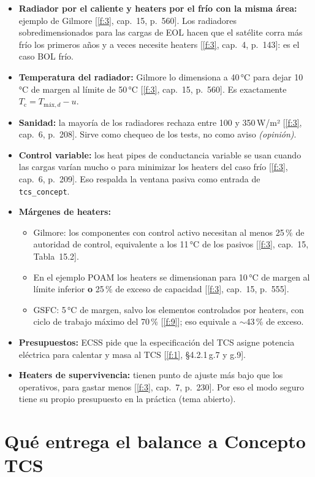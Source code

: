\documentclass[11pt,a4paper]{article}
\newcommand{\code}[1]{\texttt{#1}}
\newcommand{\op}[1]{\textcolor{opinion}{\textit{(#1)}}}
\newcommand{\f}[1]{\ref{f:#1}}
\begin{document}
\begin{itemize}
  \item \textbf{Radiador por el caliente y heaters por el frío con la misma área:} ejemplo de Gilmore [\f{3}, cap.~15, p.~560]. Los radiadores sobredimensionados para las cargas de EOL hacen que el satélite corra más frío los primeros años y a veces necesite heaters [\f{3}, cap.~4, p.~143]: es el caso BOL frío.
  \item \textbf{Temperatura del radiador:} Gilmore lo dimensiona a 40\,°C para dejar 10\,°C de margen al límite de 50\,°C [\f{3}, cap.~15, p.~560]. Es exactamente $T_\mathrm{c} = T_{\text{máx},d} - u$.
  \item \textbf{Sanidad:} la mayoría de los radiadores rechaza entre 100 y 350\,W/m² [\f{3}, cap.~6, p.~208]. Sirve como chequeo de los tests, no como aviso \op{opinión}.
  \item \textbf{Control variable:} los heat pipes de conductancia variable se usan cuando las cargas varían mucho o para minimizar los heaters del caso frío [\f{3}, cap.~6, p.~209]. Eso respalda la ventana pasiva como entrada de \code{tcs\_concept}.
  \item \textbf{Márgenes de heaters:}
  \begin{itemize}
    \item Gilmore: los componentes con control activo necesitan al menos 25\,\% de autoridad de control, equivalente a los 11\,°C de los pasivos [\f{3}, cap.~15, Tabla~15.2].
    \item En el ejemplo POAM los heaters se dimensionan para 10\,°C de margen al límite inferior \textbf{o} 25\,\% de exceso de capacidad [\f{3}, cap.~15, p.~555].
    \item GSFC: 5\,°C de margen, salvo los elementos controlados por heaters, con ciclo de trabajo máximo del 70\,\% [\f{9}]; eso equivale a $\sim$43\,\% de exceso.
  \end{itemize}
  \item \textbf{Presupuestos:} ECSS pide que la especificación del TCS asigne potencia eléctrica para calentar y masa al TCS [\f{1}, §4.2.1\,g.7 y g.9].
  \item \textbf{Heaters de supervivencia:} tienen punto de ajuste más bajo que los operativos, para gastar menos [\f{3}, cap.~7, p.~230]. Por eso el modo seguro tiene su propio presupuesto en la práctica (tema abierto).
\end{itemize}

\section{Qué entrega el balance a Concepto TCS}\label{sec:entrega}
\end{document}
